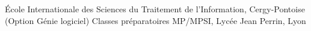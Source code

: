 %
%
%


\begin{scholarship}
					{École Internationale des Sciences du Traitement de l’Information, Cergy-Pontoise (Option Génie logiciel)}
					{Classes préparatoires MP/MPSI, Lycée Jean Perrin, Lyon}
\end{scholarship}
